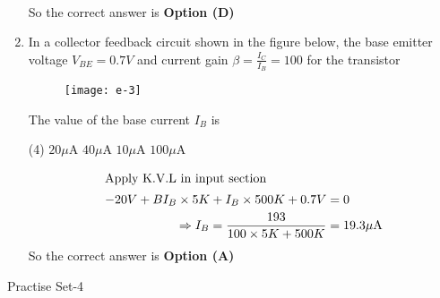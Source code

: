 \begin{enumerate}
\begin{answer}
\begin{align*}
\end{align*}
So the correct answer is \textbf{Option (D)}
\end{answer}
	\item In a collector feedback circuit shown in the figure below, the base emitter voltage $V_{B E}=0.7 V$ and current gain $\beta=\frac{I_{C}}{I_{B}}=100$ for the transistor\\
	\begin{figure}[H]
		\centering
		\texttt{[image: e-3]}
	\end{figure}
	The value of the base current $I_{B}$ is
{	}
\begin{tasks}(4)
\task[\textbf{A.}] $20 \mu \mathrm{A}$
\task[\textbf{B.}]  $40 \mu \mathrm{A}$
\task[\textbf{C.}] $10 \mu \mathrm{A}$
\task[\textbf{D.}] $100 \mu \mathrm{A}$
\end{tasks}
\begin{answer}
\begin{align*}
\intertext{Apply K.V.L in input section}
-20 V+B I_{B} \times 5 K+I_{B} \times 500 K+0.7 V&=0\\
\Rightarrow I_{B}=\frac{193}{100 \times 5 K+500 K}&=19.3 \mu \mathrm{A}
\end{align*}
So the correct answer is \textbf{Option (A)}
\end{answer}
\end{enumerate}
\newpage
\begin{abox}
	Practise Set-4
	\end{abox}
